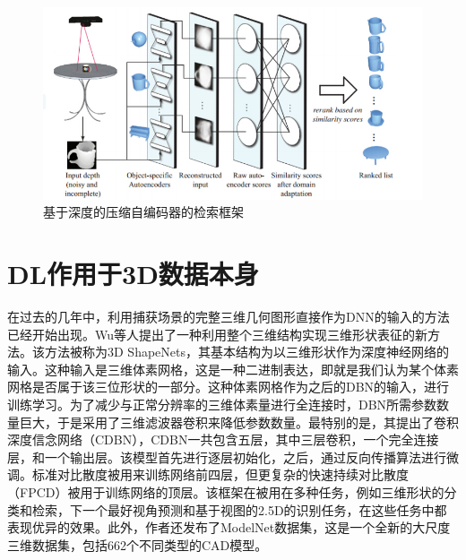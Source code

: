 \begin{figure}[htbp]
\begin{center}
\includegraphics[width=0.9\linewidth]{figures/Feng.jpg} 
\end{center} 
\vspace{-4mm}
\caption{基于深度的压缩自编码器的检索框架} 
\label{fig_Feng}
\end{figure}

\section{DL作用于3D数据本身}
在过去的几年中，利用捕获场景的完整三维几何图形直接作为DNN的输入的方法已经开始出现。Wu等人\cite{Wu20143D}提出了一种利用整个三维结构实现三维形状表征的新方法。该方法被称为3D ShapeNets，其基本结构为以三维形状作为深度神经网络的输入。这种输入是三维体素网格，这是一种二进制表达，即就是我们认为某个体素网格是否属于该三位形状的一部分。这种体素网格作为之后的DBN的输入，进行训练学习。为了减少与正常分辨率的三维体素量进行全连接时，DBN所需参数数量巨大，于是采用了三维滤波器卷积来降低参数数量。最特别的是，其提出了卷积深度信念网络（CDBN），CDBN一共包含五层，其中三层卷积，一个完全连接层，和一个输出层。该模型首先进行逐层初始化，之后，通过反向传播算法进行微调。标准对比散度被用来训练网络前四层，但更复杂的快速持续对比散度（FPCD）被用于训练网络的顶层。该框架在被用在多种任务，例如三维形状的分类和检索，下一个最好视角预测和基于视图的2.5D的识别任务，在这些任务中都表现优异的效果。此外，作者还发布了ModelNet数据集，这是一个全新的大尺度三维数据集，包括662个不同类型的CAD模型。

